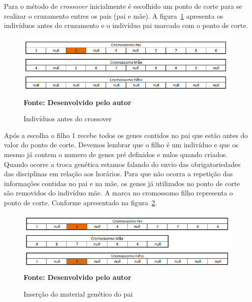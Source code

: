 Para o método de \textit{crossover} inicialmente é escolhido um ponto de corte para se realizar o cruzamento entres os pais (pai e mãe). A figura~\ref{fig:antesCross} apresenta os indivíduos antes do cruzamento e o indivíduo pai marcado com o ponto de corte.\par

\begin{figure}[!htb]
\caption[Indivíduos antes do crossover]{Indivíduos antes do crossover}
\label{fig:antesCross}
\centering
\includegraphics[scale=0.7]{imagens/individuosAntesInsersaoGenetica.png}
\\ \textbf{\footnotesize Fonte: Desenvolvido pelo autor}
\end{figure}

Após a escolha o filho 1 recebe todos os genes contidos no pai que estão antes do valor do ponto de corte. Devemos lembrar que o filho é um indivíduo e que os mesmo já contem o numero de genes pré definidos e nulos quando criados. Quando ocorre a troca genética estamos falando do envio das obrigatoriedades das disciplinas em relação aos horários. Para que não ocorra a repetição das informações contidas no pai e na mãe, os genes já utilizados no ponto de corte são removidos do indivíduo mãe. A marca no cromossomo filho representa o ponto de corte. Conforme apresentado na figura~\ref{fig:materialPai}.

\begin{figure}[!htb]
\caption[Inserção do material genético do pai]{Inserção do material genético do pai}
\label{fig:materialPai}
\centering
\includegraphics[scale=0.6]{imagens/individuosAposInsersaoGenetica.png}
\\ \textbf{\footnotesize Fonte: Desenvolvido pelo autor}
\end{figure}

